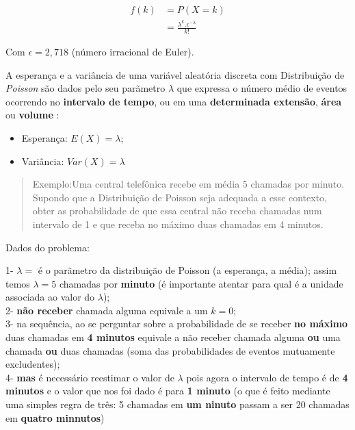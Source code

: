 \documentclass[
]{book}
\providecommand{\tightlist}{%
  \setlength{\itemsep}{0pt}\setlength{\parskip}{0pt}}
\begin{document}
\hfill\break

\begin{align*}
f(k) & = P(X=k) \\
     & = \frac{\lambda^{k}. \epsilon^{-\lambda}} {k!} 
\end{align*}

Com \(\epsilon= 2,718\) (número irracional de Euler).

\hfill\break

A esperança e a variância de uma variável aleatória discreta com Distribuição de \emph{Poisson} são dados pelo seu parãmetro \(\lambda\) que expressa o número médio de eventos ocorrendo no \textbf{intervalo de tempo}, ou em uma \textbf{determinada extensão}, \textbf{área} ou \textbf{volume} :

\begin{itemize}
\tightlist
\item
  Esperança: \(E(X) = \lambda\);\\
\item
  Variância: \(Var(X) = \lambda\)
\end{itemize}

\hfill\break

\begin{quote}
Exemplo:Uma central telefônica recebe em média 5 chamadas por minuto. Supondo que a Distribuição de Poisson seja adequada a esse contexto, obter as probabilidade de que essa central não receba chamadas num intervalo de 1 e que receba no máximo duas chamadas em 4 minutos.
\end{quote}

\hfill\break

Dados do problema:

1- \(\lambda=\) é o parãmetro da distribuição de Poisson (a esperança, a média); assim temos \(\lambda=5\) chamadas por \textbf{minuto} (é importante atentar para qual é a unidade associada ao valor do \(\lambda\));\\
2- \textbf{não receber} chamada alguma equivale a um \(k=0\);\\
3- na sequência, ao se perguntar sobre a probabilidade de se receber \textbf{no máximo} duas chamadas em \textbf{4 minutos} equivale a não receber chamada alguma \textbf{ou} uma chamada \textbf{ou} duas chamadas (soma das probabilidades de eventos mutuamente excludentes);\\
4- \textbf{mas} é necessário reestimar o valor de \(\lambda\) pois agora o intervalo de tempo é de \textbf{4 minutos} e o valor que nos foi dado é para \textbf{1 minuto} (o que é feito mediante uma simples regra de três: 5 chamadas em \textbf{um ninuto} passam a ser 20 chamadas em \textbf{quatro minnutos})
\end{document}
